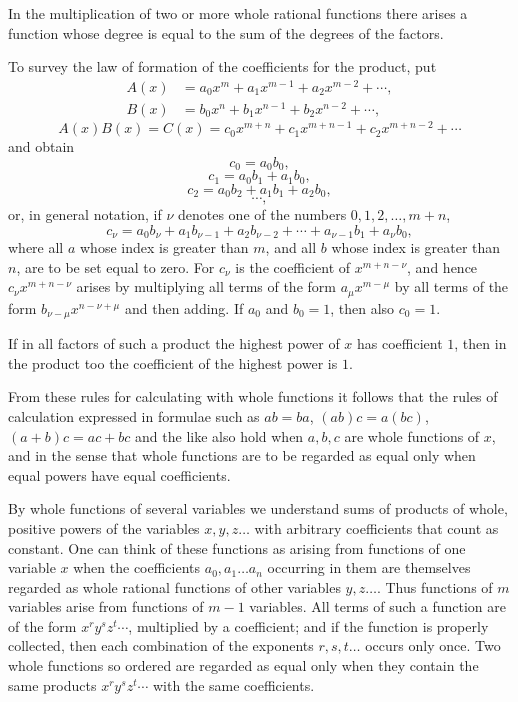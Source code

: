 \documentclass[11pt]{article}
\begin{document}
In the multiplication of two or more whole rational functions there arises a function whose degree is equal to the sum of the degrees of the factors.

To survey the law of formation of the coefficients for the product, put
\begin{equation}
\begin{aligned}
 A(x)&=a_0x^m+a_1x^{m-1}+a_2x^{m-2}+\cdots,\\
 B(x)&=b_0x^n+b_1x^{n-1}+b_2x^{n-2}+\cdots,
\end{aligned}
\tag{2}
\end{equation}
\begin{equation}
 A(x)B(x)=C(x)=c_0x^{m+n}+c_1x^{m+n-1}+c_2x^{m+n-2}+\cdots
\tag{3}
\end{equation}
and obtain
\[
 c_0=a_0b_0,
\]
\[
 c_1=a_0b_1+a_1b_0,
\]
\[
 c_2=a_0b_2+a_1b_1+a_2b_0,
\]
\[
 \cdots,
\]
or, in general notation, if $\nu$ denotes one of the numbers $0,1,2,
\ldots,m+n$,
\begin{equation}
 c_\nu=a_0b_\nu+a_1b_{\nu-1}+a_2b_{\nu-2}+\cdots+a_{\nu-1}b_1+a_\nu b_0,
\tag{4}
\end{equation}
where all $a$ whose index is greater than $m$, and all $b$ whose index is greater than $n$, are to be set equal to zero. For $c_\nu$ is the coefficient of $x^{m+n-\nu}$, and hence $c_\nu x^{m+n-\nu}$ arises by multiplying all terms of the form $a_\mu x^{m-\mu}$ by all terms of the form $b_{\nu-\mu}x^{n-\nu+\mu}$ and then adding. If $a_0$ and $b_0=1$, then also $c_0=1$.

If in all factors of such a product the highest power of $x$ has coefficient $1$, then in the product too the coefficient of the highest power is $1$.

From these rules for calculating with whole functions it follows that the rules of calculation expressed in formulae such as $ab=ba$, $(ab)c=a(bc)$, $(a+b)c=ac+bc$ and the like also hold when $a,b,c$ are whole functions of $x$, and in the sense that whole functions are to be regarded as equal only when equal powers have equal coefficients.

By whole functions of several variables we understand sums of products of whole, positive powers of the variables $x,y,z\ldots$ with arbitrary coefficients that count as constant. One can think of these functions as arising from functions of one variable $x$ when the coefficients $a_0,a_1\ldots a_n$ occurring in them are themselves regarded as whole rational functions of other variables $y,z\ldots$. Thus functions of $m$ variables arise from functions of $m-1$ variables. All terms of such a function are of the form $x^r y^s z^t\cdots$, multiplied by a coefficient; and if the function is properly collected, then each combination of the exponents $r,s,t\ldots$ occurs only once. Two whole functions so ordered are regarded as equal only when they contain the same products $x^r y^s z^t\cdots$ with the same coefficients.
\end{document}
